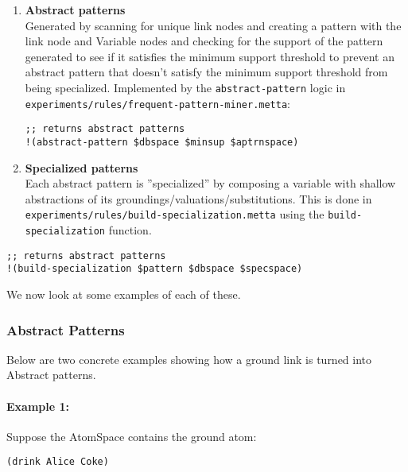\documentclass{article}
\begin{document}
\begin{enumerate}

  \item \textbf{Abstract patterns}\\

  Generated by scanning for unique link nodes and creating a pattern with the link node and Variable nodes and checking for the support of the pattern generated to see if it satisfies the minimum support threshold to prevent an abstract pattern that doesn't satisfy the minimum support threshold from being specialized.  Implemented by the \texttt{abstract-pattern} logic in \texttt{experiments/rules/frequent-pattern-miner.metta}:

    \begin{verbatim}
;; returns abstract patterns
!(abstract-pattern $dbspace $minsup $aptrnspace)
    \end{verbatim}

  \item \textbf{Specialized patterns}\\
    Each abstract pattern is ''specialized'' by composing a variable with shallow abstractions of its groundings/valuations/substitutions.  This is done in \texttt{experiments/rules/build-specialization.metta} using the \texttt{build-specialization} function.
\end{enumerate}

    \begin{verbatim}
;; returns abstract patterns
!(build-specialization $pattern $dbspace $specspace)
    \end{verbatim}

We now look at some examples of each of these.

\subsubsection{Abstract Patterns}

Below are two concrete examples showing how a ground link is turned into Abstract patterns.

\paragraph{Example 1:}

Suppose the AtomSpace contains the ground atom:

\begin{verbatim}
(drink Alice Coke)

\end{verbatim}
\end{document}
